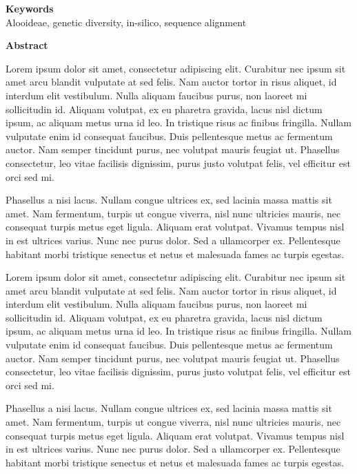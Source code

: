 \documentclass[
  letterpaper,
  DIV=11,
  numbers=noendperiod]{scrreprt}
\begin{document}
\noindent\textbf{Keywords}\\
Alooideae, genetic diversity, in-silico, sequence alignment

\newpage
\thispagestyle{empty}
{\fontsize{16pt}{20pt}\selectfont \textbf{Abstract} \par}


Lorem ipsum dolor sit amet, consectetur adipiscing elit. Curabitur nec ipsum sit amet arcu blandit vulputate at sed felis. Nam auctor tortor in risus aliquet, id interdum elit vestibulum. Nulla aliquam faucibus purus, non laoreet mi sollicitudin id. Aliquam volutpat, ex eu pharetra gravida, lacus nisl dictum ipsum, ac aliquam metus urna id leo. In tristique risus ac finibus fringilla. Nullam vulputate enim id consequat faucibus. Duis pellentesque metus ac fermentum auctor. Nam semper tincidunt purus, nec volutpat mauris feugiat ut. Phasellus consectetur, leo vitae facilisis dignissim, purus justo volutpat felis, vel efficitur est orci sed mi.

Phasellus a nisi lacus. Nullam congue ultrices ex, sed lacinia massa mattis sit amet. Nam fermentum, turpis ut congue viverra, nisl nunc ultricies mauris, nec consequat turpis metus eget ligula. Aliquam erat volutpat. Vivamus tempus nisl in est ultrices varius. Nunc nec purus dolor. Sed a ullamcorper ex. Pellentesque habitant morbi tristique senectus et netus et malesuada fames ac turpis egestas.

Lorem ipsum dolor sit amet, consectetur adipiscing elit. Curabitur nec ipsum sit amet arcu blandit vulputate at sed felis. Nam auctor tortor in risus aliquet, id interdum elit vestibulum. Nulla aliquam faucibus purus, non laoreet mi sollicitudin id. Aliquam volutpat, ex eu pharetra gravida, lacus nisl dictum ipsum, ac aliquam metus urna id leo. In tristique risus ac finibus fringilla. Nullam vulputate enim id consequat faucibus. Duis pellentesque metus ac fermentum auctor. Nam semper tincidunt purus, nec volutpat mauris feugiat ut. Phasellus consectetur, leo vitae facilisis dignissim, purus justo volutpat felis, vel efficitur est orci sed mi.

Phasellus a nisi lacus. Nullam congue ultrices ex, sed lacinia massa mattis sit amet. Nam fermentum, turpis ut congue viverra, nisl nunc ultricies mauris, nec consequat turpis metus eget ligula. Aliquam erat volutpat. Vivamus tempus nisl in est ultrices varius. Nunc nec purus dolor. Sed a ullamcorper ex. Pellentesque habitant morbi tristique senectus et netus et malesuada fames ac turpis egestas.
\end{document}
